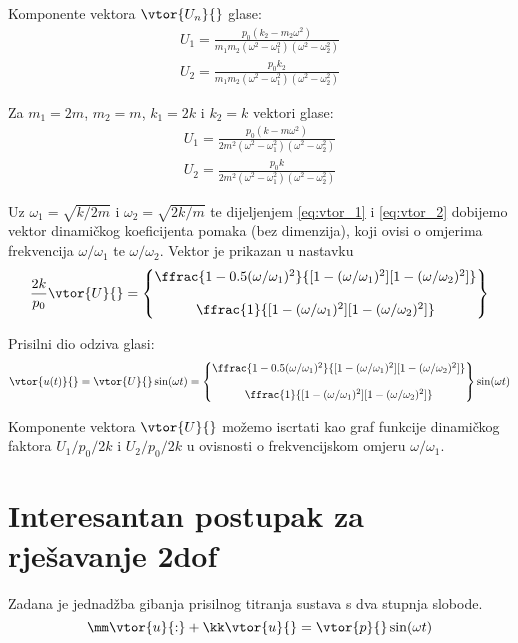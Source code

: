 Komponente vektora $\vtor{U_n}{}$ glase:
\begin{align}
    U_1=\frac{p_0(k_2-m_2\omega^2)}{m_1m_2(\omega^2-\omega_1^2)(\omega^2-\omega_2^2)} \label{eq:vtor_1_opce}\\
    U_2=\frac{p_0k_2}{m_1m_2(\omega^2-\omega_1^2)(\omega^2-\omega_2^2)}\label{eq:vtor_2_opce}
\end{align}

Za $m_1=2m$, $m_2=m$, $k_1=2k$ i $k_2=k$ vektori glase:
\begin{align}
    U_1=\frac{p_0(k-m\omega^2)}{2m^2(\omega^2-\omega_1^2)(\omega^2-\omega_2^2)}\label{eq:vtor_1}\\
    U_2=\frac{p_0k}{2m^2(\omega^2-\omega_1^2)(\omega^2-\omega_2^2)}\label{eq:vtor_2}
\end{align}

Uz $\omega_1=\sqrt{k/2m}$ i $\omega_2=\sqrt{2k/m}$ te dijeljenjem \eqref{eq:vtor_1} i \eqref{eq:vtor_2}
dobijemo vektor dinamičkog koeficijenta pomaka (bez dimenzija), koji ovisi o
omjerima frekvencija $\omega/\omega_1$ te $\omega/\omega_2$. Vektor je prikazan u nastavku
\begin{equation}
    \frac{2k}{p_0}\vtor{U}{}
    =
    \begin{Bmatrix}
        \ffrac{1-0.5(\omega/\omega_1)^2}
              {[1-(\omega/\omega_1)^2][1-(\omega/\omega_2)^2]}\\[12pt]
        \ffrac{1}
              {[1-(\omega/\omega_1)^2][1-(\omega/\omega_2)^2]}
    \end{Bmatrix}
\end{equation}

Prisilni dio odziva glasi:
\begin{equation}
    \vtor{u(t)}{} = \vtor{U}{}\sin(\omega t) = 
    \begin{Bmatrix}
        \ffrac{1-0.5(\omega/\omega_1)^2}
              {[1-(\omega/\omega_1)^2][1-(\omega/\omega_2)^2]}\\[12pt]
        \ffrac{1}
              {[1-(\omega/\omega_1)^2][1-(\omega/\omega_2)^2]}
    \end{Bmatrix}
    \sin(\omega t)
\end{equation}

Komponente vektora $\vtor{U}{}$ možemo iscrtati kao graf funkcije dinamičkog faktora
$U_1/p_0/2k$ i $U_2/p_0/2k$ u ovisnosti o frekvencijskom omjeru $\omega/\omega_1$.

\section{Interesantan postupak za rješavanje 2dof}
Zadana je jednadžba gibanja prisilnog titranja sustava s dva stupnja slobode.
\begin{equation}\label{eq:jdn_gibanja_osnovno}
    \mm\vtor{u}{:}+\kk\vtor{u}{}=\vtor{p}{}\sin(\omega t)
\end{equation}

